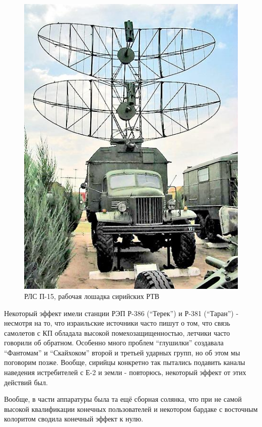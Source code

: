 \begin{figure}[h!tb] 
	\centering\includegraphics[scale=0.5]{Bekaa_1/FQ2CUDJPd6M.jpg}
	\caption{РЛС П-15, рабочая лошадка сирийских РТВ}%
\end{figure}

Некоторый эффект имели станции РЭП Р-386 (“Терек”) и Р-381 (“Таран”) - несмотря на то, что израильские источники часто пишут о том, что связь самолетов с КП обладала высокой помехозащищенностью, летчики часто говорили об обратном. Особенно много проблем “глушилки” создавала “Фантомам” и “Скайхоком” второй и третьей ударных групп, но об этом мы поговорим позже. Вообще, сирийцы конкретно так пытались подавить каналы наведения истребителей с Е-2 и земли - повторюсь, некоторый эффект от этих действий был.

Вообще, в части аппаратуры была та ещё сборная солянка, что при не самой высокой квалификации конечных пользователей и некотором бардаке с восточным колоритом сводила конечный эффект к нулю.

